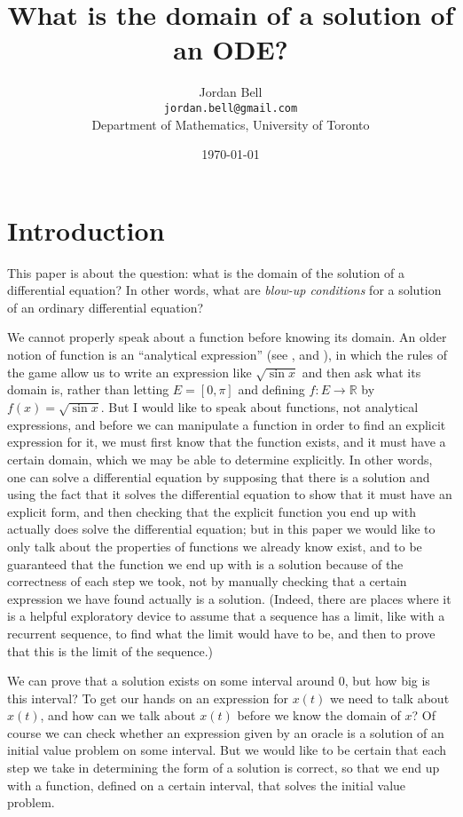 \documentclass{article}
\begin{document}
\title{What is the domain of a solution of an ODE?}
\author{Jordan Bell\\ \texttt{jordan.bell@gmail.com}\\Department of Mathematics, University of Toronto}
\date{\today}

\maketitle

\section{Introduction}
This paper is about the question: what is the domain of the solution of a differential equation? In other words, what are {\em blow-up conditions} for a solution of an ordinary differential equation?


We cannot properly speak about a function before knowing its domain. An older notion of function is an ``analytical expression'' (see \cite[p.~61]{MR0497639}, \cite{kleiner} and \cite[Chapter 5]{stewart}), in which the rules of the game
allow us to write an expression like $\sqrt{\sin x}$ and then ask what its domain is, rather than letting $E=[0,\pi]$ and defining $f:E \to \mathbb{R}$ by
$f(x)=\sqrt{\sin x}$. But I would like to speak about functions, not analytical expressions, and before we can manipulate a function in order to find an explicit expression for it, we must first know that the function exists, and it must have a 
certain domain, which we may be able to  determine explicitly. In other words, one can solve a differential equation by supposing that there is a solution and using the fact
that it solves the differential equation to show that it must have an explicit form, and then checking that the explicit function you end up with actually does solve the differential equation;
but in this paper we would like to only talk about the properties of functions we already know exist, and to be guaranteed that the function we end up with is a solution because
of the correctness of each step we took, not by manually checking that a certain expression we have found actually is a solution. (Indeed, there are places where it is a helpful
exploratory device to assume that a sequence has a limit, like with a recurrent sequence, to find what the limit would have to be, and then to prove that this is the limit of the sequence.)



We can prove that a solution exists on some interval around $0$, but how big is this interval? 
To get our hands on an expression for $x(t)$
we need to talk about $x(t)$, and how can we talk about $x(t)$ before we know the domain of $x$? Of course
we can check whether an expression given by an oracle is a solution of an initial value problem on some interval. But we would like to
be certain that each step we take in determining the form of a solution is correct, so that we end up with a function, defined on a certain interval, that solves
the initial value problem.
\end{document}
